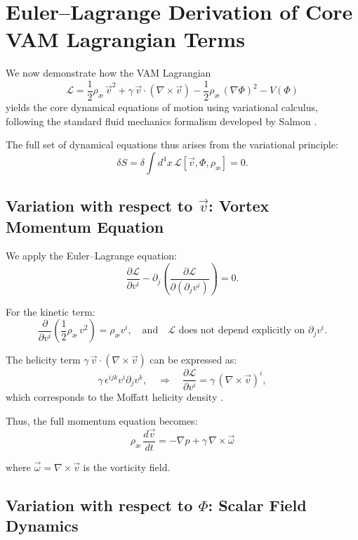 \section{Euler--Lagrange Derivation of Core VAM Lagrangian Terms}\label{sec:EL-derivation}

We now demonstrate how the VAM Lagrangian
\[
    \mathcal{L} = \frac{1}{2} \rho_\text{\ae}\, \vec{v}^2 + \gamma\, \vec{v} \cdot (\nabla \times \vec{v}) - \frac{1}{2} \rho_\text{\ae}\, (\nabla \Phi)^2 - V(\Phi)
\]
yields the core dynamical equations of motion using variational calculus, following the standard fluid mechanics formalism developed by Salmon \cite{salmon1988}.

The full set of dynamical equations thus arises from the variational principle:
\[
    \delta S = \delta \int d^4x\, \mathcal{L}[\vec{v}, \Phi, \rho_\text{\ae}] = 0.
\]

\subsection*{Variation with respect to $\vec{v}$: Vortex Momentum Equation}

We apply the Euler--Lagrange equation:
\[
    \frac{\partial \mathcal{L}}{\partial v^i} - \partial_j \left( \frac{\partial \mathcal{L}}{\partial (\partial_j v^i)} \right) = 0.
\]

For the kinetic term:
\[
    \frac{\partial}{\partial v^i} \left( \frac{1}{2} \rho_\text{\ae}\, v^2 \right) = \rho_\text{\ae} v^i,
    \quad \text{and} \quad
    \mathcal{L} \text{ does not depend explicitly on } \partial_j v^i.
\]

The helicity term \( \gamma\, \vec{v} \cdot (\nabla \times \vec{v}) \) can be expressed as:
\[
    \gamma\, \epsilon^{ijk} v^i \partial_j v^k,
    \quad \Rightarrow \quad \frac{\partial \mathcal{L}}{\partial v^i} = \gamma\, (\nabla \times \vec{v})^i,
\]
which corresponds to the Moffatt helicity density \cite{moffatt1969}.

Thus, the full momentum equation becomes:
\begin{equation}
    \boxed{
        \rho_\text{\ae}\, \frac{d \vec{v}}{dt} = - \nabla p + \gamma\, \nabla \times \vec{\omega}
    }
\end{equation}

where \( \vec{\omega} = \nabla \times \vec{v} \) is the vorticity field.


\subsection*{Variation with respect to $\Phi$: Scalar Field Dynamics}

